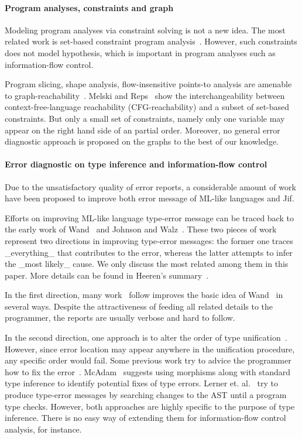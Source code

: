 \paragraph{Program analyses, constraints and graph} 

Modeling program analyses via constraint solving is not a new idea. The most
related work is set-based constraint program
analysis~\cite{aiken-setconstraint, aiken-typeinclusion}.  However, such
constraints does not model hypothesis, which is important in program analyses
such as information-flow control.
 
Program slicing, shape analysis, flow-insensitive points-to analysis are
amenable to graph-reachability~\cite{reps-graph}. Melski and
Reps~\cite{melski-cflgraph} show the interchangeability between
context-free-language reachability (CFG-reachability) and a subset of
set-based constraints. But only a small set of constraints, namely
only one variable may appear on the right hand side of an partial
order. Moreover, no general error diagnostic approach is proposed on
the graphs to the best of our knowledge. 

\paragraph{Error diagnostic on type inference and information-flow
control} 

Due to the unsatisfactory quality of error reports, a considerable
amount of work have been proposed to improve both error message of
ML-like languages and Jif.

Efforts on improving ML-like language type-error message can be traced back to
the early work of Wand~\cite{wand-errorfinding} and Johnson and
Walz~\cite{johnson-popl86}. These two pieces of work represent two directions
in improving type-error messages: the former one traces _everything_ that
contributes to the error, whereas the latter attempts to infer the _most
likely_ cause. We only discuss the most related among them in this paper. More
details can be found in Heeren's summary~\cite{heeren:thesis}.

In the first direction, many work~\cite{choppella95, haack:slicing,
tip:slicing} follow improves the basic idea of Wand~\cite{wand-errorfinding} in
several ways. Despite the attractiveness of feeding all related details to the
programmer, the reports are usually verbose and hard to follow.

In the second direction, one approach is to alter the order of type
unification~\cite{lee:toplas, mcadam:unification}. However, since error
location may appear anywhere in the unification procedure, any specific order
would fail. Some previous work try to advice the programmer how to fix the
error~\cite{mcadam:thesis, lerner:pldi07}. McAdam~\cite{mcadam:thesis} suggests
using morphisms along with standard type inference to identify potential fixes
of type errors. Lerner et. al.~\cite{lerner:pldi07} try to produce type-error
messages by searching changes to the AST until a program type checks. However,
both approaches are highly specific to the purpose of type inference. There is
no easy way of extending them for information-flow control analysis, for
instance.

